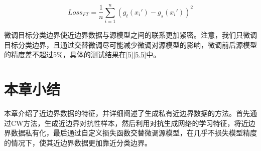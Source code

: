 \begin{equation}
	\label{eq:3.4}
	Loss_{FT} = \frac{1}{n} \sum^{n}_{i = 1} (g_t(x_i') - g_s(x_i'))^2
\end{equation}

微调目标分类边界使近边界数据与源模型之间的联系更加紧密。注意，我们只微调目标分类边界，且通过交替微调尽可能减少微调对源模型的影响，微调前后源模型的精度差不超过5\%，具体的测试结果在\ref{5}\ref{5.5}中。

\section{本章小结}

本章介绍了近边界数据的特征，并详细阐述了生成私有近边界数据的方法。首先通过CW方法，生成近边界对抗性样本，然后利用对抗生成网络的学习特征，将近边界数据私有化，最后通过自定义损失函数交替微调源模型，在几乎不损失模型精度的情况下，使其近边界数据更加靠近分类边界。
